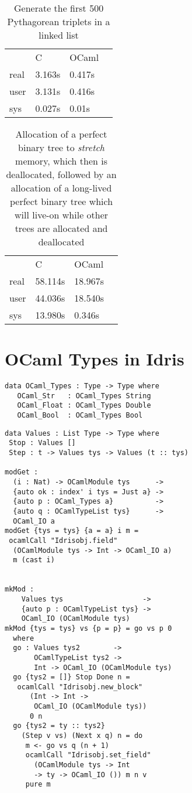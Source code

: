 \documentclass[a4paper,11pt,twocolumn]{article}
\begin{document}
\begin{table}
    \centering
    \caption{Generate the first 500 Pythagorean triplets in a linked list}
    \begin{tabular}{llll}\label{tab:pythagtab}
             & C      & OCaml  & \\
        real & 3.163s & 0.417s & \\
        user & 3.131s & 0.416s & \\
        sys  & 0.027s & 0.01s  &
    \end{tabular}
\end{table}


\begin{table}
    \centering
    \caption{Allocation of a perfect binary tree to \emph{stretch} memory, which then is deallocated, followed by an allocation of a long-lived perfect binary tree which will live-on while other trees are allocated and deallocated}
    \begin{tabular}{llll}\label{tab:bintreetab}
             & C       & OCaml   & \\
        real & 58.114s & 18.967s & \\
        user & 44.036s & 18.540s & \\
        sys  & 13.980s & 0.346s  &
    \end{tabular}
\end{table}





\section{OCaml Types in Idris}

\begin{lstlisting}
data OCaml_Types : Type -> Type where
   OCaml_Str   : OCaml_Types String
   OCaml_Float : OCaml_Types Double
   OCaml_Bool  : OCaml_Types Bool
\end{lstlisting}


\begin{lstlisting}
data Values : List Type -> Type where
 Stop : Values []
 Step : t -> Values tys -> Values (t :: tys)

modGet :
  (i : Nat) -> OCamlModule tys      ->
  {auto ok : index' i tys = Just a} ->
  {auto p : OCaml_Types a}          -> 
  {auto q : OCamlTypeList tys}      ->
  OCaml_IO a
modGet {tys = tys} {a = a} i m = 
 ocamlCall "Idrisobj.field" 
  (OCamlModule tys -> Int -> OCaml_IO a) 
  m (cast i)


mkMod : 
    Values tys                   -> 
    {auto p : OCamlTypeList tys} ->
    OCaml_IO (OCamlModule tys)
mkMod {tys = tys} vs {p = p} = go vs p 0 
  where
  go : Values tys2        ->
       OCamlTypeList tys2 ->
       Int -> OCaml_IO (OCamlModule tys)
  go {tys2 = []} Stop Done n =
   ocamlCall "Idrisobj.new_block" 
      (Int -> Int -> 
       OCaml_IO (OCamlModule tys)) 
      0 n
  go {tys2 = ty :: tys2} 
    (Step v vs) (Next x q) n = do
     m <- go vs q (n + 1)
     ocamlCall "Idrisobj.set_field" 
       (OCamlModule tys -> Int 
       -> ty -> OCaml_IO ()) m n v
     pure m 
\end{lstlisting}
\end{document}
